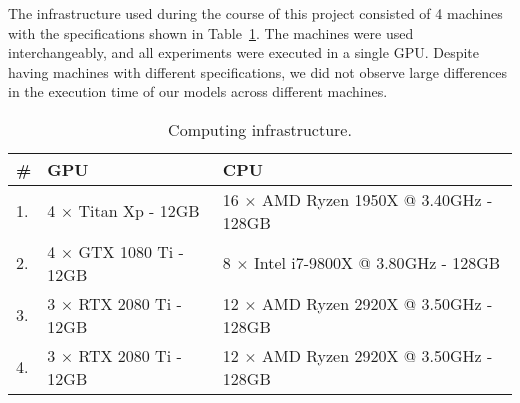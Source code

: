 \label{app:infrastructure}

\cleardoublepage
\doublespacing

\noindent The infrastructure used during the course of this project
consisted of 4 machines with the specifications
shown in Table~\ref{table:computing_infrastructure}. The machines
were used interchangeably, and all experiments were executed in a
single GPU. Despite having machines with different specifications, we
did not observe large differences in the execution time of our models
across different machines.

\begin{table}[!hb]
    \small
    \begin{center}
        \begin{tabular}{l ll}
            \toprule
            \sc \# & \sc GPU                       & \sc CPU                                       \\
            \midrule
            1.     & 4 $\times$ Titan Xp - 12GB    & 16 $\times$ AMD Ryzen 1950X @ 3.40GHz - 128GB \\
            2.     & 4 $\times$ GTX 1080 Ti - 12GB & 8 $\times$ Intel i7-9800X @ 3.80GHz - 128GB   \\
            3.     & 3 $\times$ RTX 2080 Ti - 12GB & 12 $\times$ AMD Ryzen 2920X @ 3.50GHz - 128GB \\
            4.     & 3 $\times$ RTX 2080 Ti - 12GB & 12 $\times$ AMD Ryzen 2920X @ 3.50GHz - 128GB \\
            \bottomrule
        \end{tabular}
    \end{center}
    \caption{Computing infrastructure.}
    \label{table:computing_infrastructure}
\end{table}

